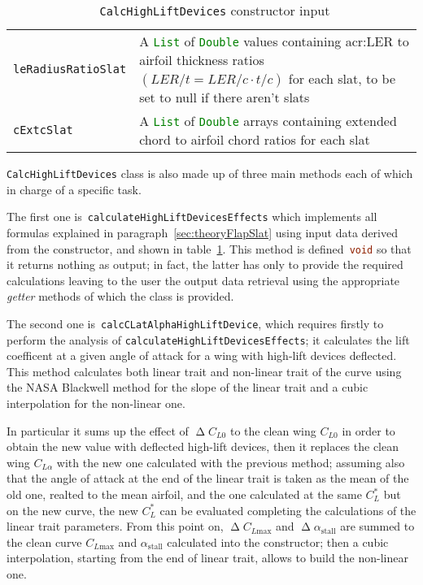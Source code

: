 \begin{table}[!t]
{\begin{tabular}{p{0.2\linewidth}p{0.8\linewidth}}
\lstinline[language=Java]!leRadiusRatioSlat! & A \lstinline[language=Java]!List! of  \lstinline[language=Java]!Double! values containing \gls{acr:LER} to airfoil thickness ratios $\left(LER/t=LER/c\cdot t/c\right)$ for each slat, to be set to null if there aren't slats \\  [0.2cm]
\lstinline[language=Java]!cExtcSlat! & A \lstinline[language=Java]!List! of  \lstinline[language=Java]!Double! arrays containing extended chord to airfoil chord ratios for each slat \\ 
\bottomrule
\end{tabular}
}
\caption{~\lstinline[language=Java]!CalcHighLiftDevices! constructor input}
\label{table:CalcHighLiftConstructor}
\end{table}

\bigskip
\noindent
\lstinline[language=Java]!CalcHighLiftDevices! class is also made up of three main methods each of which in charge of a specific task. 

\noindent
The first one is~\lstinline[language=Java]!calculateHighLiftDevicesEffects! which implements all formulas explained in paragraph~\ref{sec:theoryFlapSlat} using input data derived from the constructor, and shown in table~\ref{table:CalcHighLiftConstructor}. This method is defined~\lstinline[language=Java]!void! so that it returns nothing as output; in fact, the latter has only to provide the required calculations leaving to the user the output data retrieval using the appropriate \emph{getter} methods of which the class is provided. 

\bigskip
\noindent
The second one is~\lstinline[language=Java]!calcCLatAlphaHighLiftDevice!, which requires firstly to perform the analysis of \lstinline[language=Java]!calculateHighLiftDevicesEffects!; it calculates the lift coefficent at a given angle of attack for a wing with high-lift devices deflected. This method calculates both linear trait and non-linear trait of the curve using the NASA Blackwell method for the slope of the linear trait and a cubic interpolation for the non-linear one. 

In particular it sums up the effect of $\upDelta C_{L0}$ to the clean wing $C_{L0}$ in order to obtain the new value with deflected high-lift devices, then it replaces the clean wing $C_{L\alpha}$ with the new one calculated with the previous method; assuming also that the angle of attack at the end of the linear trait is taken as the mean of the old one, realted to the mean airfoil, and the one calculated at the same $C_L^*$ but on the new curve, the new $C_L^*$  can be evaluated completing the calculations of the linear trait parameters. From this point on, $\upDelta C_{L\text{max}}$ and $\upDelta\alpha_{\text{stall}}$ are summed to the clean curve $C_{L\text{max}}$ and $\alpha_{\text{stall}}$ calculated into the constructor; then a cubic interpolation, starting from the end of linear trait, allows to build the non-linear one.

